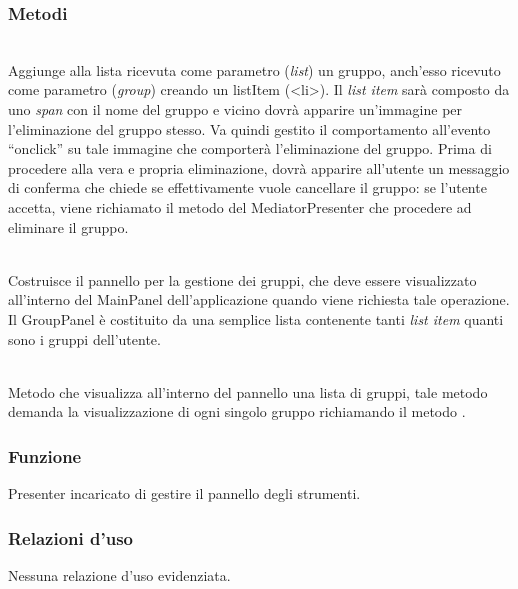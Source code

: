 \subsubsection*{Metodi}
\begin{description}
\item{}\\
Aggiunge alla lista ricevuta come parametro (\textit{list}) un gruppo, anch'esso ricevuto come parametro (\textit{group}) creando un listItem (<li>). Il \textit{list item} sarà composto da uno \textit{span} con il nome del gruppo e vicino dovrà apparire un'immagine per l'eliminazione del gruppo stesso. Va quindi gestito il comportamento all'evento ``onclick'' su tale immagine che comporterà l'eliminazione del gruppo. Prima di procedere alla vera e propria eliminazione, dovrà apparire all'utente un messaggio di conferma che chiede se effettivamente vuole cancellare il gruppo: se l'utente accetta, viene richiamato il metodo del MediatorPresenter  che procedere ad eliminare il gruppo.

\item{}\\
Costruisce il pannello per la gestione dei gruppi, che deve essere visualizzato all'interno del MainPanel dell'applicazione quando viene richiesta tale operazione. Il GroupPanel è costituito da una semplice lista contenente tanti \textit{list item} quanti sono i gruppi dell'utente.

\item{}\\
Metodo che visualizza all'interno del pannello una lista di gruppi, tale metodo demanda la visualizzazione di ogni singolo gruppo richiamando il metodo .

\end{description}



\subsubsection*{Funzione}
Presenter incaricato di gestire il pannello degli strumenti.

\subsubsection*{Relazioni d'uso}
Nessuna relazione d'uso evidenziata.

